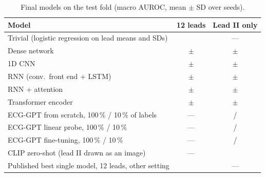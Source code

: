\begin{table}[H]
\centering
\caption{Final models on the test fold (macro AUROC, mean $\pm$ SD over seeds).}
\label{tab:summary}
\small
\begin{tabular}{lcc}
\toprule
Model & 12 leads & Lead II only \\
\midrule
Trivial (logistic regression on lead means and SDs) & \comparisonTestAurocMeanTrivial{} & --- \\
Dense network & \comparisonTestAurocMeanTwelveDense{} $\pm$ \comparisonTestAurocSdTwelveDense{} & \comparisonTestAurocMeanOneleadDense{} $\pm$ \comparisonTestAurocSdOneleadDense{} \\
1D CNN & \textbf{\comparisonTestAurocMeanTwelveCnn{}} $\pm$ \comparisonTestAurocSdTwelveCnn{} & \textbf{\comparisonTestAurocMeanOneleadCnn{}} $\pm$ \comparisonTestAurocSdOneleadCnn{} \\
RNN (conv.\ front end + LSTM) & \comparisonTestAurocMeanTwelveRnn{} $\pm$ \comparisonTestAurocSdTwelveRnn{} & \comparisonTestAurocMeanOneleadRnn{} $\pm$ \comparisonTestAurocSdOneleadRnn{} \\
RNN + attention & \comparisonTestAurocMeanTwelveRnnattn{} $\pm$ \comparisonTestAurocSdTwelveRnnattn{} & \comparisonTestAurocMeanOneleadRnnattn{} $\pm$ \comparisonTestAurocSdOneleadRnnattn{} \\
Transformer encoder & \comparisonTestAurocMeanTwelveTransformer{} $\pm$ \comparisonTestAurocSdTwelveTransformer{} & \comparisonTestAurocMeanOneleadTransformer{} $\pm$ \comparisonTestAurocSdOneleadTransformer{} \\
\midrule
ECG-GPT from scratch, 100\,\% / 10\,\% of labels & --- & \comparisonTestAurocMeanScratchFOneZeroZero{} / \comparisonTestAurocMeanScratchFOneZero{} \\
ECG-GPT linear probe, 100\,\% / 10\,\% & --- & \comparisonTestAurocMeanProbeFOneZeroZero{} / \comparisonTestAurocMeanProbeFOneZero{} \\
ECG-GPT fine-tuning, 100\,\% / 10\,\% & --- & \comparisonTestAurocMeanFinetuneFOneZeroZero{} / \comparisonTestAurocMeanFinetuneFOneZero{} \\
CLIP zero-shot (lead II drawn as an image) & --- & \comparisonTestAurocMeanZeroshot{} \\
\midrule
Published best single model, 12 leads, other setting \cite{strodthoff2021deep} & \comparisonPublishedStrodthoffResnetOneDWang{} & --- \\
\bottomrule
\end{tabular}
\end{table}

